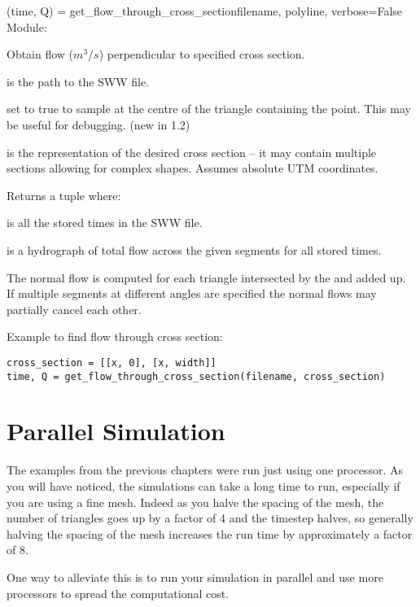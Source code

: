 \documentclass{manual}
\begin{document}
\begin{funcdesc}{(time, Q) = get_flow_through_cross_section}{filename, polyline, verbose=False}
Module: 

Obtain flow ($m^3/s$) perpendicular to specified cross section.

 is the path to the SWW file.

 set to true to sample at the centre of the triangle containing the point.
This may be useful for debugging. (new in 1.2)

 is the representation of the desired cross section -- it may contain
multiple sections allowing for complex shapes. Assumes absolute UTM coordinates.

Returns a tuple  where:

 is all the stored times in the SWW file.

 is a hydrograph of total flow across the given segments for all stored times.

The normal flow is computed for each triangle intersected by the  and
added up.  If multiple segments at different angles are specified the normal flows
may partially cancel each other.

Example to find flow through cross section:

\begin{verbatim}
cross_section = [[x, 0], [x, width]]
time, Q = get_flow_through_cross_section(filename, cross_section)
\end{verbatim}
\end{funcdesc}


\chapter{Parallel Simulation}

The examples from the previous chapters were run just using one processor. As you will have noticed, the simulations can take a long time to run, especially if you are using a fine mesh. Indeed as you halve the spacing of the mesh, the number of triangles goes up by a factor of 4 and the timestep halves, so generally halving the spacing of the mesh increases the run time by approximately a factor of 8.

One way to alleviate this is to run your simulation in parallel and use more processors to spread the computational cost.
\end{document}
